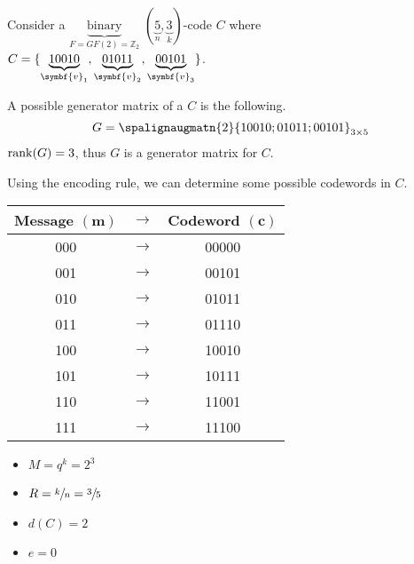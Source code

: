 
\begin{Example}{}{}
    Consider a $ \underbrace{\text{binary}}_{F=GF(2)=\mathbb{Z}_2} $
    $ (\underbrace{5}_{n},\underbrace{3}_{k}) $-code $ C $
    where
    $ C=\set{\underbrace{10010}_{\symbf{v}_1},\underbrace{01011}_{\symbf{v}_2},\underbrace{00101}_{\symbf{v}_3}} $.

    A possible generator matrix of a $ C $ is the following.
    \[ G=
        \spalignaugmatn{2}{
            1 0 0 1 0; 0 1 0 1 1; 0 0 1 0 1}_{3\times{}5}
    \]
    $ \operatorname{rank}(G)=3 $, thus $ G $ is a generator matrix for $ C $.

    Using the encoding rule, we can determine some possible codewords in $ C $.
    \begin{table}[H]
        \centering
        \begin{tabular}{@{}ccc@{}}
            Message $ (\symbf{m}) $ & $ \rightarrow $ & Codeword $ (\symbf{c}) $ \\
            \midrule
            000                     & $ \rightarrow $ & 00000                    \\
            001                     & $ \rightarrow $ & 00101                    \\
            010                     & $ \rightarrow $ & 01011                    \\
            011                     & $ \rightarrow $ & 01110                    \\
            100                     & $ \rightarrow $ & 10010                    \\
            101                     & $ \rightarrow $ & 10111                    \\
            110                     & $ \rightarrow $ & 11001                    \\
            111                     & $ \rightarrow $ & 11100
        \end{tabular}
    \end{table}
    \begin{itemize}
        \item $ M=q^k=2^3 $
        \item $ R=\sfrac{k}{n}=\sfrac{3}{5} $
        \item $ d(C)=2 $
        \item $ e=0 $
    \end{itemize}
\end{Example}

